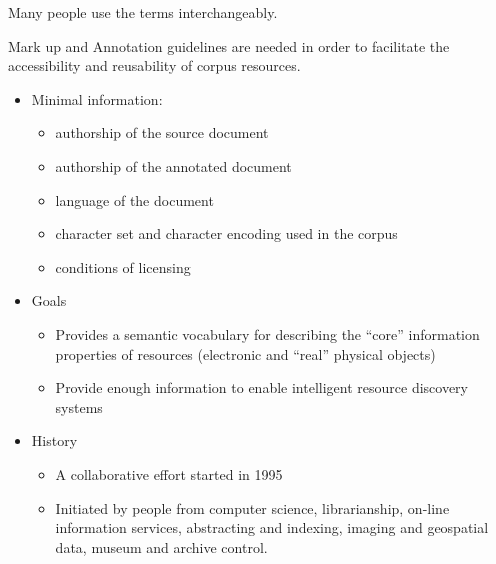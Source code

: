 \documentclass[a4paper,landscape,headrule,footrule,xetex]{foils}
\begin{document}
Many people use the terms interchangeably.



Mark up and Annotation guidelines are needed in order to
facilitate the accessibility and reusability of corpus
resources.
\begin{itemize}
\item Minimal information:
  \begin{itemize}
  \item authorship of the source document
  \item authorship of the annotated document
  \item language of the document
  \item character set and character encoding used in the corpus
  \item conditions of licensing
  \end{itemize}
\end{itemize}

\begin{itemize}
\item Goals
\begin{itemize}
\item Provides a semantic vocabulary for describing the
``core'' information properties of resources (electronic
and ``real'' physical objects)
\item Provide enough information to enable intelligent
resource discovery systems

\end{itemize}

\item History
\begin{itemize}
\item A collaborative effort started in 1995
\item Initiated by people from computer science,
librarianship, on-line information services, abstracting
and indexing, imaging and geospatial data, museum
and archive control.
\end{itemize}
\end{itemize}
\end{document}
